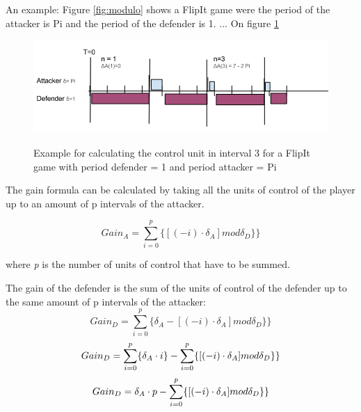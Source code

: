 An example: Figure \ref{fig:modulo} shows a FlipIt game were the period of the attacker is Pi and the period of the defender is 1. ...
On figure \ref{fig:unitofcontrolformula} 

\begin{figure}[hbtp]
\caption{Example for calculating the control unit in interval 3 for a FlipIt game with period defender = 1 and period attacker = Pi}
\centering
\includegraphics[scale=0.6]{Images/VoorbeeldUnit.png}
\label{fig:unitofcontrolformula}
\end{figure}

The gain formula can be calculated by taking all the units of control of the player up to an amount of p intervals of the attacker. 

\begin{equation}\label{first}
Gain_{A} = \sum_{i=0}^{p} \lbrace [( - i ) \cdot \delta_{A}] mod \delta_{D}  \rbrace \rbrace 
\end{equation}

where \textit{p} is the number of units of control that have to be summed.  



The gain of the defender is the sum of the units of control of the defender up to the same amount of p intervals of the attacker:
\begin{equation}\label{first}
Gain_{D} = \sum_{i=0}^{p} \lbrace \delta_{A} - [( - i ) \cdot \delta_{A}] mod \delta_{D} \rbrace  \rbrace  
\end{equation}
\begin{equation}\label{first}
Gain_{D} = \sum_{i=0}^{p} \lbrace \delta_{A} \cdot i \rbrace - \sum_{i=0}^{p} \lbrace [( - i ) \cdot \delta_{A}] mod \delta_{D} \rbrace \rbrace  \\
\end{equation}
\begin{equation}\label{first}
Gain_{D} =\delta_{A} \cdot p - \sum_{i=0}^{p} \lbrace [( - i ) \cdot \delta_{A}] mod \delta_{D} \rbrace  \rbrace  \\
\end{equation}

